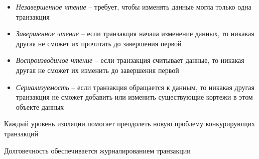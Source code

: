 \documentclass[12pt, a4paper]{article}
\begin{document}
\begin{itemize}
    \item \emph{Незавершенное чтение} -- требует, чтобы изменять данные могла только одна транзакция
    
    \item \emph{Завершенное чтение} -- если транзакция начала изменение данных, то никакая другая не сможет их прочитать до завершения первой
    
    \item \emph{Воспроизводимое чтение} -- если транзакция считывает данные, то никакая другая не сможет их изменить до завершения первой
    
    \item \emph{Сериализуемость} -- если транзакция обращается к данным, то никакая другая транзакция не сможет добавить или изменить существующие кортежи в этом объекте данных
    
\end{itemize}

Каждый уровень изоляции помогает преодолеть новую проблему конкурирующих транзакций

Долговечность обеспечивается журналированием транзакции
\end{document}

